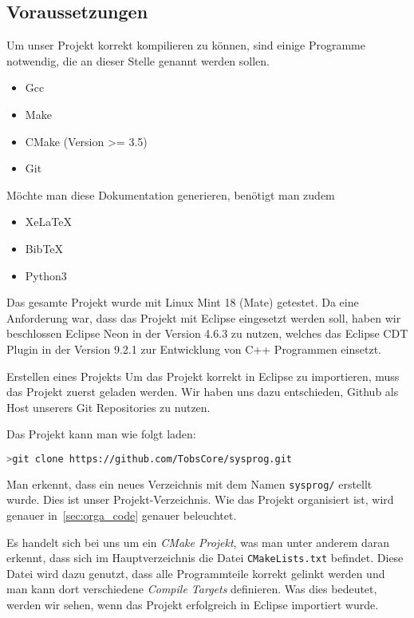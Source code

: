 \subsection{Voraussetzungen}
Um unser Projekt korrekt kompilieren zu können, sind einige Programme notwendig, die an dieser Stelle genannt werden sollen.
\begin{itemize}
  \item Gcc
  \item Make
  \item CMake (Version >= \textsc{3.5})
  \item Git
\end{itemize}

Möchte man diese Dokumentation generieren, benötigt man zudem
\begin{itemize}
  \item XeLaTeX
  \item BibTeX
  \item Python3
\end{itemize}
Das gesamte Projekt wurde mit Linux Mint 18 (Mate) getestet. Da eine Anforderung war, dass das Projekt mit Eclipse eingesetzt werden soll, haben wir beschlossen Eclipse Neon in der Version 4.6.3 zu nutzen, welches das Eclipse CDT Plugin in der Version 9.2.1 zur Entwicklung von C++ Programmen einsetzt.

Erstellen eines Projekts
Um das Projekt korrekt in Eclipse zu importieren, muss das Projekt zuerst geladen werden. Wir haben uns dazu entschieden, Github als Host unserers Git Repositories zu nutzen.

Das Projekt kann man wie folgt laden:

\begin{lstlisting}[language=bash,numbers=none]
>git clone https://github.com/TobsCore/sysprog.git
\end{lstlisting}

Man erkennt, dass ein neues Verzeichnis mit dem Namen \texttt{sysprog/} erstellt wurde. Dies ist unser Projekt-Verzeichnis. Wie das Projekt organisiert ist, wird genauer in~\ref{sec:orga_code} genauer beleuchtet.

Es handelt sich bei uns um ein \textit{CMake Projekt}, was man unter anderem daran erkennt, dass sich im Hauptverzeichnis die Datei \texttt{CMakeLists.txt} befindet. Diese Datei wird dazu genutzt, dass alle Programmteile korrekt gelinkt werden und man kann dort verschiedene \textit{Compile Targets} definieren. Was dies bedeutet, werden wir sehen, wenn das Projekt erfolgreich in Eclipse importiert wurde.

